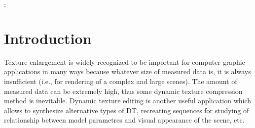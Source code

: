 \begin{abstract}

A simple and fast approach for synthesizing dynamic textures that realistically matches given color 
		texture appearance and the optic flow is presented. The method generalizes the previous work in 
		spatial area which works well for static textures to the dynamic textures domain. Our method  
		is based on overlapping tiling and subsequent minimum boundary cut. Optimal toroidal dynamic texture 
		patches are created in each spatial and dynamic dimension, where they are derived from the optical
		 flow of the modeled texture. The toroidal patches are created in the analytical step which is 
		 separated from the synthesis part. The method is extremely fast (both in the spatial as well as 
		 in the time dimension), works well for many types of natural dynamic textures, and it is very easy 
		 to implement.

\end{abstract}


\begin{CRcatlist}
  ;
\end{CRcatlist}

\keywordlist

\section{Introduction}


\copyrightspace

	Texture enlargement is widely recognized to be important for computer graphic applications in many ways because whatever size of measured data is, it is always insufficient  (i.e., for rendering of a complex and large scenes). The amount of measured data can be extremely high, thus some  dynamic texture 
compression method   is inevitable. Dynamic texture editing  is another  useful  application which allows to synthesize alternative types of DT, recreating sequences for studying of relationship between model parametres and visual appearance of the scene, etc. 

